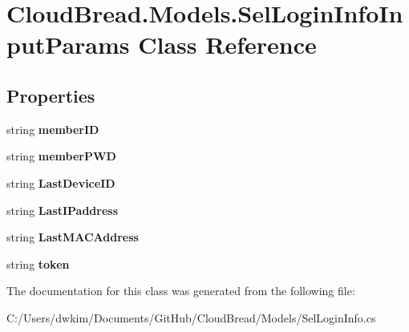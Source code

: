 \hypertarget{a00096}{}\section{Cloud\+Bread.\+Models.\+Sel\+Login\+Info\+Input\+Params Class Reference}
\label{a00096}
\subsection*{Properties}
\begin{DoxyCompactItemize}
\item 
string {\bfseries member\+ID}\hypertarget{a00096_a391f187784870ee4f2bd2d0e8573accb}{}\label{a00096_a391f187784870ee4f2bd2d0e8573accb}

\item 
string {\bfseries member\+P\+WD}\hypertarget{a00096_a9487d2d6bc66b3ab27eb0a720b23101f}{}\label{a00096_a9487d2d6bc66b3ab27eb0a720b23101f}

\item 
string {\bfseries Last\+Device\+ID}\hypertarget{a00096_a5524ec86408077e9feadea75dce53ed8}{}\label{a00096_a5524ec86408077e9feadea75dce53ed8}

\item 
string {\bfseries Last\+I\+Paddress}\hypertarget{a00096_ab582dab1738ac346fc5ca2f32fe45f42}{}\label{a00096_ab582dab1738ac346fc5ca2f32fe45f42}

\item 
string {\bfseries Last\+M\+A\+C\+Address}\hypertarget{a00096_a6661b94d55c0d084c2c52104afa46716}{}\label{a00096_a6661b94d55c0d084c2c52104afa46716}

\item 
string {\bfseries token}\hypertarget{a00096_ab859ebd354ab45aa4d740c4e4bb10823}{}\label{a00096_ab859ebd354ab45aa4d740c4e4bb10823}

\end{DoxyCompactItemize}


The documentation for this class was generated from the following file\+:\begin{DoxyCompactItemize}
\item 
C\+:/\+Users/dwkim/\+Documents/\+Git\+Hub/\+Cloud\+Bread/\+Models/Sel\+Login\+Info.\+cs\end{DoxyCompactItemize}
